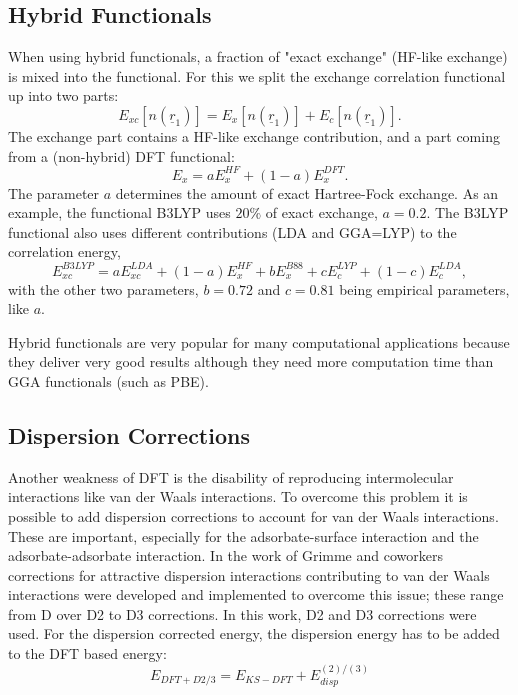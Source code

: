 \documentclass[11pt,DIV=13,BCOR=5mm,a4paper,headinclude]{scrbook}
\renewcommand{\vec}[1]{\underline{#1}}
\begin{document}
\subsection{Hybrid Functionals}
When using hybrid functionals, a fraction of "exact exchange" (HF-like exchange) is mixed into the functional.
For this we split the exchange correlation functional up into two parts:
\begin{equation}
 E_{xc}[n(\vec{r}_1)]=  E_{x}[n(\vec{r}_1)] + E_{c}[n(\vec{r}_1)].
\end{equation}
The exchange part contains a HF-like exchange contribution, and a part coming from a (non-hybrid) DFT functional:
\begin{equation}
 E_x = aE_x^{HF} + (1-a)E_x^{DFT}.
\end{equation}
The parameter $a$ determines the amount of exact Hartree-Fock exchange.
As an example, the functional B3LYP uses $20\%$ of exact exchange\cite{Becke1993}, $a=0.2$.
The B3LYP functional also uses different contributions (LDA and GGA=LYP) to the correlation energy,
\begin{equation}
 E_{xc}^{B3LYP}= aE_{xc}^{LDA} + (1-a)E_x^{HF} + bE_x^{B88} + cE_c^{LYP} + (1-c)E_c^{LDA},
\end{equation}
with the other two parameters, $b=0.72$ and $c=0.81$ being empirical parameters, like $a$.


Hybrid functionals are very popular for many computational applications because they deliver very good results although they need more computation time than GGA functionals (such as PBE).

\subsection{Dispersion Corrections}
Another weakness of DFT is the disability of reproducing intermolecular interactions like van der Waals interactions.
To overcome this problem it is possible to add dispersion corrections to account for van der Waals interactions.
These are important, especially for the adsorbate-surface interaction and the adsorbate-adsorbate interaction.
In the work of Grimme\cite{grimme06} and coworkers corrections for attractive dispersion interactions contributing to van der Waals interactions were developed and implemented to overcome this issue; these range from D over D2 to D3 corrections.
In this work, D2 and D3 corrections were used.
For the dispersion corrected energy, the dispersion energy has to be added to the DFT based energy:
\begin{equation}
E_{DFT+D2/3}=E_{KS-DFT} + E_{disp}^{(2)/(3)}
\end{equation}
\end{document}
